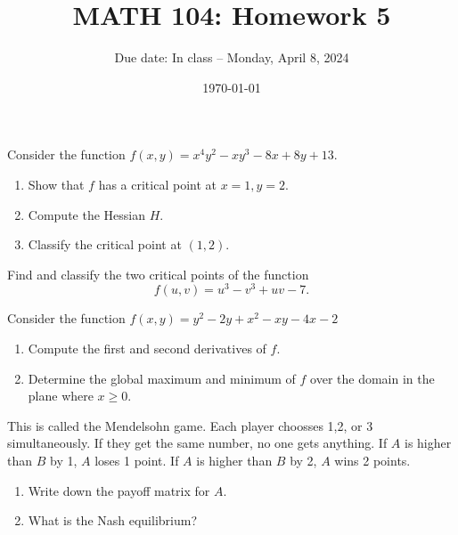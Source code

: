 \documentclass[12pt]{amsart}
\title{ MATH 104: Homework 5}
\author{Due date: In class -- Monday, April 8, 2024}
\date{\today}
\begin{document}
\maketitle

\begin{problem}
 Consider the function $f(x, y)=x^4 y^2-x y^3-8 x+8 y+13$.
\begin{enumerate}
    \item  Show that $f$ has a critical point at $x=1, y=2$.
    \item Compute the Hessian $H$.
    \item Classify the critical point at $(1,2)$.
\end{enumerate}

\end{problem}

\begin{problem}
 Find and classify the two critical points of the function
$$
f(u, v)=u^3-v^3+u v-7 .
$$
\end{problem}

\begin{problem}
 Consider the function $f(x, y)=y^2-2 y+x^2-x y-4 x-2$
 \begin{enumerate}
     \item Compute the first and second derivatives of $f$.
     \item Determine the global maximum and minimum of $f$ over the domain in the plane where $x \geq 0$.
 \end{enumerate}
\end{problem}


\begin{problem}
    This is called the Mendelsohn game.
    Each player choosses 1,2, or 3 simultaneously.
    If they get the same number, no one gets anything.
    If $A$ is higher than $B$ by 1, $A$ loses 1 point.
    If $A$ is higher than $B$ by 2, $A$ wins 2 points.

    \begin{enumerate}
        \item Write down the payoff matrix for $A$.
        \item What is the Nash equilibrium?
    \end{enumerate}
\end{problem}
\end{document}
